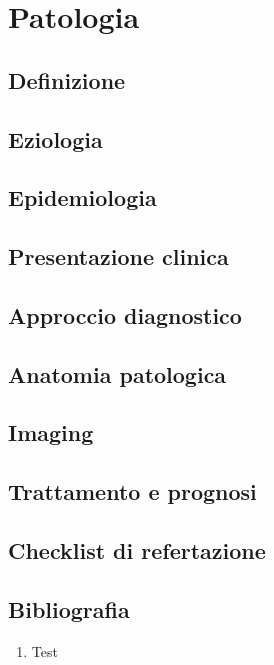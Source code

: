 \section{Patologia}

\subsection{Definizione}

\subsection{Eziologia}

\subsection{Epidemiologia}

\subsection{Presentazione  clinica}

\subsection{Approccio diagnostico}

\subsection{Anatomia patologica}

\subsection{Imaging}

\subsection{Trattamento e prognosi}

\subsection{Checklist di refertazione}

\subsection{Bibliografia}
\small{
\begin{enumerate}
	\item Test
\end{enumerate}

}

